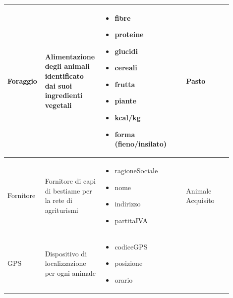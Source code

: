 \documentclass[12pt,a4paper]{article}
\begin{document}
\begin{center}
\begin{longtable}{|p{0.14\linewidth}|p{0.20\linewidth}|p{0.36\linewidth}|p{0.20\linewidth}|}
\hline
Foraggio 			& \begin{flushleft}\vspace{-25pt} Alimentazione degli animali identificato dai suoi ingredienti vegetali \end{flushleft}
					& \begin{itemize}
						\setlength{\itemindent}{-1em}
						\vspace{-25pt}
						\setlength\itemsep{-0.25em}
						\item fibre
						\item proteine
						\item glucidi
						\item cereali
						\item frutta
						\item piante
						\item kcal/kg
						\item forma (fieno/insilato)
					\end{itemize}
					& \begin{flushleft}\vspace{-25pt} Pasto \end{flushleft}\\

\hline
Fornitore 			& \begin{flushleft}\vspace{-25pt} Fornitore di capi di bestiame per la rete di agriturismi  \end{flushleft}
					& \begin{itemize}
						\setlength{\itemindent}{-1em}
						\vspace{-25pt}
						\setlength\itemsep{-0.25em}
						\item ragioneSociale
						\item nome
						\item indirizzo
						\item partitaIVA
					\end{itemize}
					& \begin{flushleft}\vspace{-25pt} Animale Acquisito \end{flushleft} \\ 

\hline
GPS 					& \begin{flushleft}\vspace{-25pt} Dispositivo di localizzazione per ogni animale \end{flushleft}
					& \begin{itemize}
						\setlength{\itemindent}{-1em}
						\vspace{-25pt}
						\setlength\itemsep{-0.25em}
						\item codiceGPS
						\item posizione
						\item orario
						

\end{itemize}
\end{longtable}
\end{center}
\end{document}
